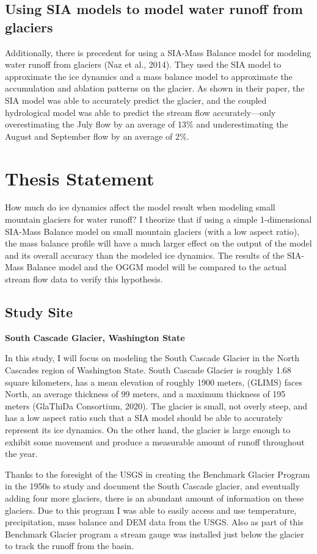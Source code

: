 \documentclass{article}
\begin{document}
\subsection{Using SIA models to model water runoff from glaciers}
    Additionally, there is precedent for using a SIA-Mass Balance model for modeling water runoff from glaciers (Naz et al., 2014). They used 
the SIA model to approximate the ice dynamics and a mass balance model to approximate the accumulation and ablation patterns on the glacier. 
As shown in their paper, the SIA model was able to accurately predict the glacier, and the coupled hydrological model was able to predict 
the stream flow accurately---only overestimating the July flow by an average of 13\% and underestimating the August and September flow by an 
average of 2\%.

\section{Thesis Statement}
How much do ice dynamics affect the model result when modeling small mountain glaciers for water runoff? I theorize that if using a simple 
1-dimensional SIA-Mass Balance model on small mountain glaciers (with a low aspect ratio), the mass balance profile will have a 
much larger effect on the output of the model and its overall accuracy than the modeled ice dynamics. The results of the SIA-Mass Balance 
model and the OGGM model will be compared to the actual stream flow data to verify this hypothesis.
\subsection{Study Site}
\textbf{\large South Cascade Glacier, Washington State}

In this study, I will focus on modeling the South Cascade Glacier in the North Cascades region of Washington State. South Cascade Glacier is 
roughly 1.68 square kilometers, has a mean elevation of roughly 1900 meters, (GLIMS) faces North, an average thickness of 99 meters, and a 
maximum thickness of 195 meters (GlaThiDa Consortium, 2020). The glacier is small, not overly steep, and has a low aspect ratio such that a 
SIA model should be able to accurately represent its ice dynamics. On the other hand, the glacier is large enough to exhibit some movement 
and produce a measurable amount of runoff throughout the year. 

Thanks to the foresight of the USGS in creating the Benchmark Glacier Program in the 1950s to study and document the South Cascade glacier, 
and eventually adding four more glaciers, there is an abundant amount of information on these glaciers. Due to this program I was able to 
easily access and use temperature, precipitation, mass balance and DEM data from the USGS. Also as part of this Benchmark Glacier program a 
stream gauge was installed just below the glacier to track the runoff from the basin. 
\end{document}
